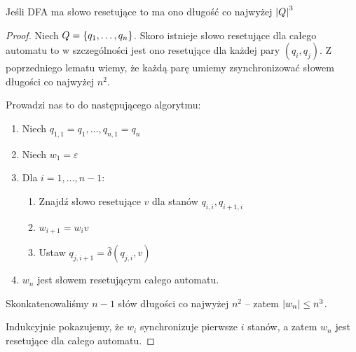 \begin{theorem}
    Jeśli DFA ma słowo resetujące to ma ono długość co najwyżej \( \card{Q}^3 \)
\end{theorem}
\begin{proof}
    Niech \( Q = \set{q_1, \dots, q_n} \).
    Skoro istnieje słowo resetujące dla całego automatu to w szczególności jest ono resetujące dla każdej pary \( (q_i, q_j) \). Z poprzedniego lematu wiemy, że każdą parę umiemy zsynchronizować słowem długości co najwyżej \( n^2 \).

    Prowadzi nas to do następującego algorytmu:
    \begin{enumerate}
        \item Niech \( q_{1, 1} = q_1, \dots, q_{n, 1} = q_n \)
        \item Niech \( w_1 = \varepsilon \)
        \item Dla \( i = 1, \dots, n - 1 \):
        \begin{enumerate}
            \item Znajdź słowo resetujące \( v \) dla stanów \( q_{i, i}, q_{i + 1, i} \)
            \item \( w_{i + 1} = w_iv \)
            \item Ustaw \( q_{j, i + 1} = \widehat \delta(q_{j, i}, v) \)
        \end{enumerate}
        \item \( w_n \) jest słowem resetującym całego automatu.
    \end{enumerate}
    
    Skonkatenowaliśmy \( n - 1 \) słów długości co najwyżej \( n^2 \) -- zatem \( \card{w_n} \leq n^3 \).
    
    Indukcyjnie pokazujemy, że \( w_i \) synchronizuje pierwsze \( i \) stanów, a zatem \( w_n \) jest resetujące dla całego automatu.
    
\end{proof}